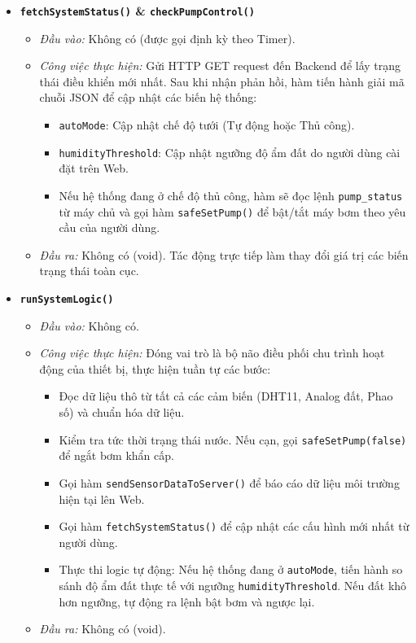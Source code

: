 \documentclass[12pt,a4paper]{report}
\begin{document}
\begin{itemize}
    \item \textbf{\texttt{fetchSystemStatus()} \& \texttt{checkPumpControl()}}
    \begin{itemize}
        \item \textit{Đầu vào:} Không có (được gọi định kỳ theo Timer).
        \item \textit{Công việc thực hiện:} Gửi HTTP GET request đến Backend để
        lấy trạng thái điều khiển mới nhất. Sau khi nhận phản hồi, hàm tiến hành
        giải mã chuỗi JSON để cập nhật các biến hệ thống:
        \begin{itemize}
            \item \texttt{autoMode}: Cập nhật chế độ tưới (Tự động hoặc Thủ công).
            \item \texttt{humidityThreshold}: Cập nhật ngưỡng độ ẩm đất do người
            dùng cài đặt trên Web.
            \item Nếu hệ thống đang ở chế độ thủ công, hàm sẽ đọc lệnh
            \texttt{pump\_status} từ máy chủ và gọi hàm \texttt{safeSetPump()} để
            bật/tắt máy bơm theo yêu cầu của người dùng.
        \end{itemize}
        \item \textit{Đầu ra:} Không có (void). Tác động trực tiếp làm thay đổi
        giá trị các biến trạng thái toàn cục.
    \end{itemize}

    \item \textbf{\texttt{runSystemLogic()}}
    \begin{itemize}
        \item \textit{Đầu vào:} Không có.
        \item \textit{Công việc thực hiện:} Đóng vai trò là bộ não điều phối chu
        trình hoạt động của thiết bị, thực hiện tuần tự các bước:
        \begin{itemize}
            \item Đọc dữ liệu thô từ tất cả các cảm biến (DHT11, Analog đất, Phao
            số) và chuẩn hóa dữ liệu.
            \item Kiểm tra tức thời trạng thái nước. Nếu cạn, gọi
            \texttt{safeSetPump(false)} để ngắt bơm khẩn cấp.
            \item Gọi hàm \texttt{sendSensorDataToServer()} để báo cáo dữ liệu
            môi trường hiện tại lên Web.
            \item Gọi hàm \texttt{fetchSystemStatus()} để cập nhật các cấu hình
            mới nhất từ người dùng.
            \item Thực thi logic tự động: Nếu hệ thống đang ở \texttt{autoMode},
            tiến hành so sánh độ ẩm đất thực tế với ngưỡng
            \texttt{humidityThreshold}. Nếu đất khô hơn ngưỡng, tự động ra lệnh
            bật bơm và ngược lại.
        \end{itemize}
        \item \textit{Đầu ra:} Không có (void).
    \end{itemize}
\end{itemize}
\end{document}
